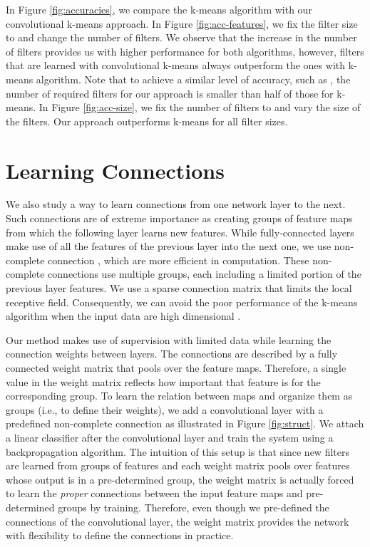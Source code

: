 \documentclass{article} \usepackage{iclr2016_workshop,times}
\begin{document}
In Figure \ref{fig:accuracies}, we compare the k-means algorithm with our convolutional k-means approach. In Figure \ref{fig:acc-features}, we fix the filter size to  and change the number of filters. We observe that the increase in the number of filters provides us with higher performance for both algorithms, however, filters that are learned with convolutional k-means always outperform the ones with k-means algorithm. Note that to achieve a similar level of accuracy, such as , the number of required filters for our approach is smaller than half of those for k-means.  
In Figure \ref{fig:acc-size}, we fix the number of filters to  and vary the size of the filters. Our approach outperforms k-means for all filter sizes.



\section{Learning Connections}
\label{sec:connections}


We also study a way to learn connections from one network layer to the next. Such connections are of extreme importance as creating groups of feature maps from which the following layer learns new features.
While fully-connected layers make use of all the features of the previous layer into the next one, we use non-complete connection  \citep{lecun1998gradient}, which are more efficient in computation. These non-complete connections use multiple groups, each including a limited portion of the previous layer features. We use a sparse connection matrix that limits the local receptive field. Consequently, we can avoid the poor performance of the k-means algorithm when the input data are high dimensional \citep{coates2011selecting}.

Our method makes use of supervision with limited data while learning the connection weights between layers.
The connections are described by a fully connected weight matrix that pools over the feature maps.
Therefore, a single value in the weight matrix reflects how important that feature is for the corresponding group.
To learn the relation between maps and organize them as groups (i.e., to define their weights), we add a convolutional layer with a predefined non-complete connection as illustrated in Figure \ref{fig:struct}.
We attach a linear classifier after the convolutional layer and train the system using a backpropagation algorithm.
The intuition of this setup is that since new filters are learned from groups of features and each weight matrix pools over features whose output is in a pre-determined group, the weight matrix is actually forced to learn the \textit{proper} connections between the input feature maps and pre-determined groups by training.
Therefore, even though we pre-defined the connections of the convolutional layer, the weight matrix provides the network with flexibility to define the connections in practice. 
\end{document}
